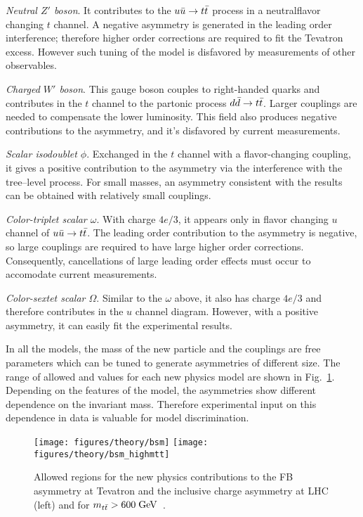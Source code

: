 {\em Neutral $Z'$ boson}. It contributes to the $\mbox{$u\bar{u}$}{}\to\mbox{$t\bar{t}$}{}$
process in a neutralflavor changing $t$ channel. A negative asymmetry
is generated in the leading order interference; therefore higher order
corrections are required to fit the Tevatron excess. However such
tuning of the model is disfavored by measurements of other observables.

{\em Charged $W'$ boson}. This gauge boson couples to right-handed
quarks and contributes in the $t$ channel to the partonic process
$\mbox{$d\bar{d}$}{}\to\mbox{$t\bar{t}$}{}$. Larger couplings are needed to compensate the
lower \ddbar{} luminosity. This field also produces negative
contributions to the asymmetry, and it's disfavored by current measurements.

{\em Scalar isodoublet $\phi$}.
Exchanged in the $t$ channel with a flavor-changing coupling, it gives
a positive contribution to the asymmetry via the interference with the
tree--level process. For small masses, an asymmetry consistent with the
\afb{} results can be obtained with relatively small couplings.

{\em Color-triplet scalar $\omega$}.
With charge $4e/3$, it appears only in flavor changing $u$ channel of
$\mbox{$u\bar{u}$}{}\to\mbox{$t\bar{t}$}{}$. The leading order contribution to the asymmetry
is negative, so large couplings are required to have large higher
order corrections. Consequently, cancellations of large leading order
effects must occur to accomodate current measurements.

{\em Color-sextet scalar $\Omega$}.
Similar to the $\omega$ above, it also has charge $4e/3$ and therefore
contributes in the $u$ channel diagram. However, with a positive
asymmetry, it can easily fit the experimental results.

In all the models, the mass of the new particle and the couplings are
free parameters which can be tuned to generate asymmetries of
different size. The range of allowed \ac{} and \afb{} values for each
new physics model are shown in Fig.~\ref{fig:bsmmodels}. Depending on
the features of the model, the asymmetries show different dependence
on the \ttbar{} invariant mass. Therefore experimental input on this
dependence in data is valuable for model discrimination. 

\begin{figure}[!htb]
  \centering
  \texttt{[image: figures/theory/bsm]} 
  \texttt{[image: figures/theory/bsm\_highmtt]} 
  \caption{Allowed regions for the new physics contributions to the FB
    asymmetry at Tevatron and the inclusive charge asymmetry at LHC
    (left) and for $\mbox{$m_{t\bar{t}}$}{}>600 \; \mathrm{GeV}$~\cite{AguilarSaavedra:2011hz}.}
  \label{fig:bsmmodels}
\end{figure}


